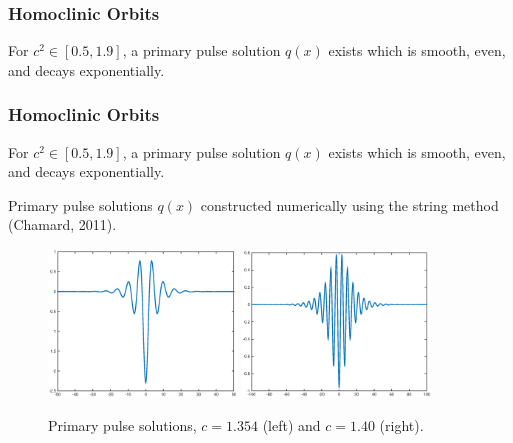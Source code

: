 \documentclass[16pt]{beamer}
\begin{document}
\begin{frame}
	\frametitle{Homoclinic Orbits}   
    \begin{theorem} For $c^2 \in [0.5, 1.9]$, a primary pulse solution $q(x)$ exists which is smooth, even, and decays exponentially.
    \end{theorem}
\end{frame}

\begin{frame}
	\frametitle{Homoclinic Orbits}   
    \begin{theorem} For $c^2 \in [0.5, 1.9]$, a primary pulse solution $q(x)$ exists which is smooth, even, and decays exponentially.
    \end{theorem}
    Primary pulse solutions $q(x)$ constructed numerically using the string method (Chamard, 2011).

	\begin{figure}
	\begin{center}
	\includegraphics[width=5cm]{images/single1354.eps}
	\includegraphics[width=5cm]{images/single14.eps}
	\caption{Primary pulse solutions, $c = 1.354$ (left) and $c = 1.40$ (right).}
	\label{fig:single1}
	\end{center}
	\end{figure}
\end{frame}
\end{document}
